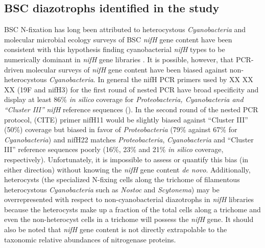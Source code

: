 \subsection{BSC diazotrophs identified in the study} BSC N-fixation has long
been attributed to heterocystous \textit{Cyanobacteria} and molecular microbial
ecology surveys of BSC \textit{nifH} gene content have been consistent with
this hypothesis finding cyanobacterial \textit{nifH} types to be numerically
dominant in \textit{nifH} gene libraries \citep{Yeager,14766579,Yeager_2012}.
It is possible, however, that PCR-driven molecular surveys of \textit{nifH}
gene content have been biased against non-heterocystous \textit{Cyanobacteria}.
In general the nifH PCR primers used by XX XX XX (19F and nifH3) for the first
round of nested PCR have broad specificity and display at least 86\% \textit{in
silico} coverage for \textit{Proteobacteria, Cyanobacteria and ``Cluster III''}
\textit{nifH} reference sequences (\citep{Gaby_2012}). In the second round of
the nested PCR protocol, (CITE) primer nifH11 would be slightly biased against
``Cluster III'' (50\%) coverage but biased in favor of \textit{Proteobacteria}
(79\% against 67\% for \textit{Cyanobacteria}) and nifH22 matches
\textit{Proteobacteria}, \textit{Cyanobacteria} and ``Cluster III'' reference
sequences poorly (16\%, 23\% and 21\% \textit{in silico} coverage,
respectively).  Unfortunately, it is impossible to assess or quantify this bias
(in either direction) without knowing the \textit{nifH} gene content \textit{de
novo}. Additionally, heterocysts (the specialized N-fixing cells along the
trichome of filamentous heterocystous \textit{Cyanobacteria} such as
\textit{Nostoc} and \textit{Scytonema}) may be overrepresented with respect to
non-cyanobacterial diazotrophs in \textit{nifH} libraries because the
heterocysts make up a fraction of the total cells along a trichome and even the
non-heterocyst cells in a trichome will possess the \textit{nifH} gene. It
should also be noted that \textit{nifH} gene content is not directly
extrapolable to the taxonomic relative abundances of nitrogenase proteins.

